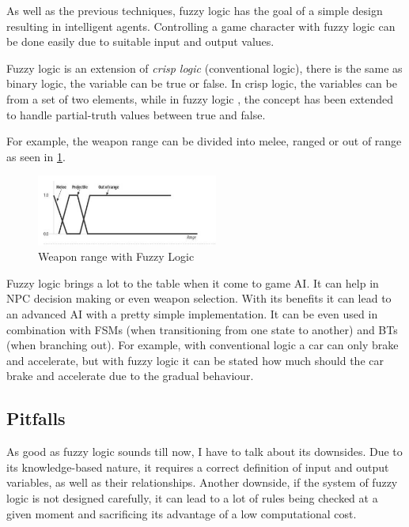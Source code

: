 \documentclass[a4paper, 12pt]{book}
\begin{document}
As well as the previous techniques, fuzzy logic has the goal of a simple design resulting in intelligent agents. Controlling a game character with fuzzy logic can be done easily due to suitable input and output values.

Fuzzy logic is an extension of \emph{crisp logic} (conventional logic), there is the same as binary logic, the variable can be true or false. In crisp logic, the variables can be from a set of two elements, while in fuzzy logic \cite{FuzzyLogicBasedGameSystem}, the concept has been extended to handle partial-truth values between true and false. 

For example, the weapon range can be divided into melee, ranged or out of range as seen in \ref{pic4}.

\begin{figure}[h]
\begin{center}
\includegraphics[width=0.53\textwidth]{Images/weapon_range.png}
\end{center}
\caption{Weapon range with Fuzzy Logic}
\label{pic4}
\end{figure}

Fuzzy logic brings a lot to the table when it come to game AI. It can help in NPC decision making or even weapon selection. With its benefits it can lead to an advanced AI with a pretty simple implementation. It can be even used in combination with FSMs (when transitioning from one state to another) and BTs (when branching out). For example, with conventional logic a car can only brake and accelerate, but with fuzzy logic it can be stated how much should the car brake and accelerate due to the gradual behaviour. 

\subsection{Pitfalls}

As good as fuzzy logic sounds till now, I have to talk about its downsides. Due to its knowledge-based nature, it requires a correct definition of input and output variables, as well as their relationships. Another downside, if the system of fuzzy logic is not designed carefully, it can lead to a lot of rules being checked at a given moment and sacrificing its advantage of a low computational cost.
\end{document}
